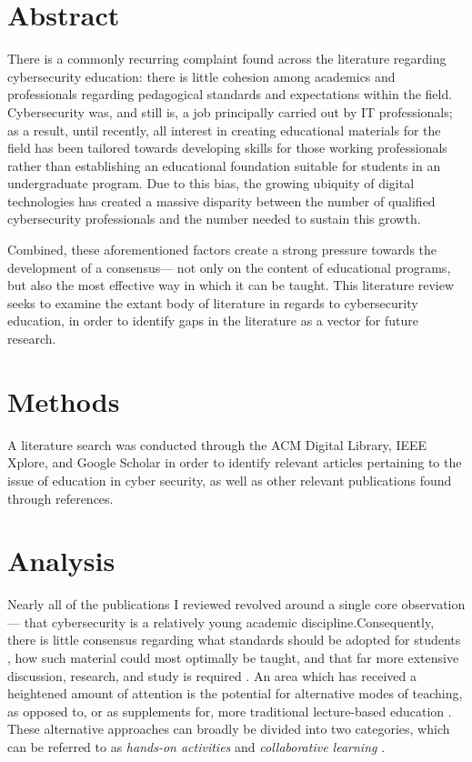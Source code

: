 \section{Abstract}

    There is a commonly recurring complaint found across the literature regarding cybersecurity education: there is little cohesion among academics and professionals regarding pedagogical standards and expectations within the field. %
Cybersecurity was, and still is, a job principally carried out by IT professionals; %
as a result, until recently, all interest in creating educational materials for the field has been tailored towards developing skills for those working professionals rather than establishing an educational foundation suitable for students in an undergraduate program. %
Due to this bias, the growing ubiquity of digital technologies has created a massive disparity between the number of qualified cybersecurity professionals and the number needed to sustain this growth. 
    
    Combined, these aforementioned factors create a strong pressure towards the development of a consensus---%
not only on the content of educational programs, but also the most effective way in which it can be taught. %
This literature review seeks to examine the extant body of literature in regards to cybersecurity education, in order to identify gaps in the literature as a vector for future research.

\section{Methods}

    A literature search was conducted through the ACM Digital Library, IEEE Xplore, and Google Scholar in order to identify relevant articles pertaining to the issue of education in cyber security, as well as other relevant publications found through references.

\section{Analysis}

    Nearly all of the publications I reviewed revolved around a single core observation---%
that cybersecurity is a relatively young academic discipline.Consequently, there is little consensus regarding what standards should be adopted for students \cite{R-Raj}, how such material could most optimally be taught, and that far more extensive discussion, research, and study is required \cite{Z-Zeng}. %
An area which has received a heightened amount of attention is the potential for alternative modes of teaching, as opposed to, or as supplements for, more traditional lecture-based education \cite{Z-Zeng,N-Eliot,E-Gavas,C-Herr,K-Chung, C-Kussmaul,K-Leune,B-Payne,L-Thomas}. %
These alternative approaches can broadly be divided into two categories, which can be referred to as \emph{hands-on activities} and \emph{collaborative learning} \cite{P-Deshpande,C-Kussmaul,B-Payne}.

